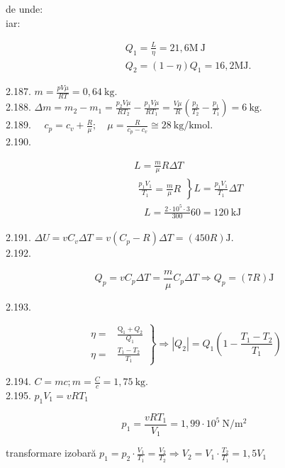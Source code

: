 de unde:\\
iar:

$$
\begin{aligned}
& Q_{1}=\frac{L}{\eta}=21,6 \mathrm{M} \mathrm{~J} \\
& Q_{2}=(1-\eta) Q_{1}=16,2 \mathrm{MJ} .
\end{aligned}
$$

2.187. $m=\frac{p V \mu}{R T}=0,64 \mathrm{~kg}$.\\
2.188. $\Delta m=m_{2}-m_{1}=\frac{p_{2} V \mu}{R T_{2}}-\frac{p_{1} V \mu}{R T_{1}}=\frac{V \mu}{R}\left(\frac{p_{2}}{T_{2}}-\frac{p_{1}}{T_{1}}\right)=6 \mathrm{~kg}$.\\
2.189. $\quad c_{p}=c_{v}+\frac{R}{\mu} ; \quad \mu=\frac{R}{c_{p}-c_{v}} \cong 28 \mathrm{~kg} / \mathrm{kmol}$.\\
2.190.

$$
\begin{aligned}
& L=\frac{m}{\mu} R \Delta T \\
& \left.\begin{array}{l}
\frac{p_{1} V_{1}}{T_{1}}=\frac{m}{\mu} R
\end{array}\right\} L=\frac{p_{1} V_{1}}{T_{1}} \Delta T \\
& \quad L=\frac{2 \cdot 10^{5} \cdot 3}{300} 60=120 \mathrm{~kJ}
\end{aligned}
$$

2.191. $\Delta U=v C_{v} \Delta T=v\left(C_{p}-R\right) \Delta T=(450 R) \mathrm{J}$.\\
2.192.

$$
Q_{p}=v C_{p} \Delta T=\frac{m}{\mu} C_{p} \Delta T \Rightarrow Q_{p}=(7 R) \mathrm{J}
$$

2.193.

$$
\left.\begin{array}{rl}
\eta= & \frac{\mathrm{Q}_{1}+Q_{2}}{Q_{1}} \\
\eta= & \frac{T_{1}-T_{2}}{T_{1}}
\end{array}\right\} \Rightarrow\left|Q_{2}\right|=Q_{1}\left(1-\frac{T_{1}-T_{2}}{T_{1}}\right)
$$

2.194. $C=m c ; m=\frac{C}{c}=1,75 \mathrm{~kg}$.\\
2.195. $p_{1} V_{1}=v R T_{1}$

$$
p_{1}=\frac{v R T_{1}}{V_{1}}=1,99 \cdot 10^{5} \mathrm{~N} / \mathrm{m}^{2}
$$

transformare izobară $p_{1}=p_{2} \cdot \frac{V_{1}}{T_{1}}=\frac{V_{2}}{T_{2}} \Rightarrow V_{2}=V_{1} \cdot \frac{T_{2}}{T_{1}}=1,5 V_{1}$


